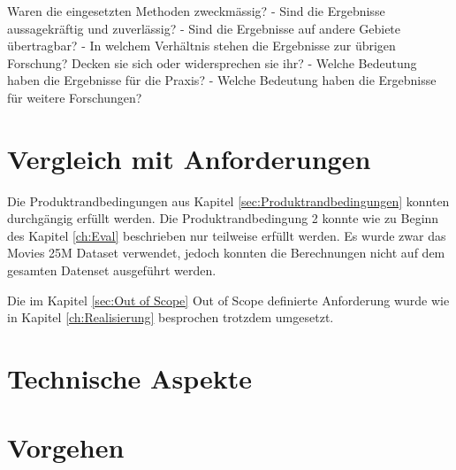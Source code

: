 Waren die eingesetzten Methoden zweckmässig?
- Sind die Ergebnisse aussagekräftig und zuverlässig?
- Sind die Ergebnisse auf andere Gebiete übertragbar?
- In welchem Verhältnis stehen die Ergebnisse zur übrigen Forschung? Decken sie sich oder
widersprechen sie ihr?
- Welche Bedeutung haben die Ergebnisse für die Praxis?
- Welche Bedeutung haben die Ergebnisse für weitere Forschungen?

\section{Vergleich mit Anforderungen}
\label{sec:VergleichAnforderungen}
Die Produktrandbedingungen aus Kapitel \ref{sec:Produktrandbedingungen} konnten durchgängig erfüllt werden. Die Produktrandbedingung 2 konnte wie zu Beginn des Kapitel \ref{ch:Eval} beschrieben nur teilweise erfüllt werden. Es wurde zwar das Movies 25M Dataset verwendet, jedoch konnten die Berechnungen nicht auf dem gesamten Datenset ausgeführt werden.

Die im Kapitel \ref{sec:Out of Scope} Out of Scope definierte Anforderung wurde wie in Kapitel \ref{ch:Realisierung} besprochen trotzdem umgesetzt.

\section{Technische Aspekte}

\section{Vorgehen}
